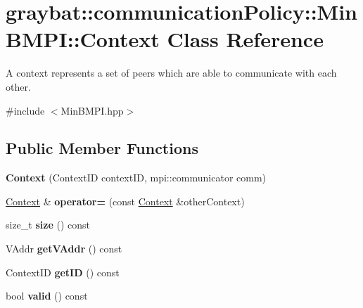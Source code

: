 \hypertarget{classgraybat_1_1communicationPolicy_1_1MinBMPI_1_1Context}{}\section{graybat\+:\+:communication\+Policy\+:\+:Min\+B\+M\+P\+I\+:\+:Context Class Reference}
\label{classgraybat_1_1communicationPolicy_1_1MinBMPI_1_1Context}


A context represents a set of peers which are able to communicate with each other.  




{\ttfamily \#include $<$Min\+B\+M\+P\+I.\+hpp$>$}

\subsection*{Public Member Functions}
\begin{DoxyCompactItemize}
\item 
\hypertarget{classgraybat_1_1communicationPolicy_1_1MinBMPI_1_1Context_a19fe228dab188d8d8c9c048287bf7713}{}{\bfseries Context} (Context\+I\+D context\+I\+D, mpi\+::communicator comm)\label{classgraybat_1_1communicationPolicy_1_1MinBMPI_1_1Context_a19fe228dab188d8d8c9c048287bf7713}

\item 
\hypertarget{classgraybat_1_1communicationPolicy_1_1MinBMPI_1_1Context_a4fbe531b2b5153dcc73dae326af9dce8}{}\hyperlink{classgraybat_1_1communicationPolicy_1_1MinBMPI_1_1Context}{Context} \& {\bfseries operator=} (const \hyperlink{classgraybat_1_1communicationPolicy_1_1MinBMPI_1_1Context}{Context} \&other\+Context)\label{classgraybat_1_1communicationPolicy_1_1MinBMPI_1_1Context_a4fbe531b2b5153dcc73dae326af9dce8}

\item 
\hypertarget{classgraybat_1_1communicationPolicy_1_1MinBMPI_1_1Context_a56395f3f839cddc70cb22162e82c721f}{}size\+\_\+t {\bfseries size} () const \label{classgraybat_1_1communicationPolicy_1_1MinBMPI_1_1Context_a56395f3f839cddc70cb22162e82c721f}

\item 
\hypertarget{classgraybat_1_1communicationPolicy_1_1MinBMPI_1_1Context_a31e4b99ea95a4c8029923eee8c84bc95}{}V\+Addr {\bfseries get\+V\+Addr} () const \label{classgraybat_1_1communicationPolicy_1_1MinBMPI_1_1Context_a31e4b99ea95a4c8029923eee8c84bc95}

\item 
\hypertarget{classgraybat_1_1communicationPolicy_1_1MinBMPI_1_1Context_a38b3b6cce34df9eff2854504b1bf3da1}{}Context\+I\+D {\bfseries get\+I\+D} () const \label{classgraybat_1_1communicationPolicy_1_1MinBMPI_1_1Context_a38b3b6cce34df9eff2854504b1bf3da1}

\item 
\hypertarget{classgraybat_1_1communicationPolicy_1_1MinBMPI_1_1Context_a8d42c152df1f2d78f64f57ae9fbbadca}{}bool {\bfseries valid} () const \label{classgraybat_1_1communicationPolicy_1_1MinBMPI_1_1Context_a8d42c152df1f2d78f64f57ae9fbbadca}

\end{DoxyCompactItemize}
